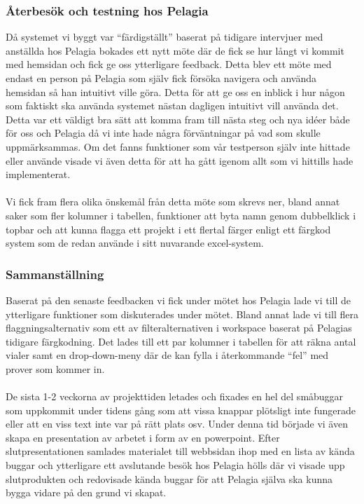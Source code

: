 \subsubsection{Återbesök och testning hos Pelagia}
Då systemet vi byggt var “färdigställt” baserat på tidigare intervjuer med anställda hos Pelagia bokades ett nytt möte där de fick se hur långt vi kommit med hemsidan och fick ge oss ytterligare feedback. Detta blev ett möte med endast en person på Pelagia som själv fick försöka navigera och använda hemsidan så han intuitivt ville göra. Detta för att ge oss en inblick i hur någon som faktiskt ska använda systemet nästan dagligen intuitivt vill använda det. Detta var ett väldigt bra sätt att komma fram till nästa steg och nya idéer både för oss och Pelagia då vi inte hade några förväntningar på vad som skulle uppmärksammas. Om det fanns funktioner som vår testperson själv inte hittade eller använde visade vi även detta för att ha gått igenom allt som vi hittills hade implementerat. 
\\
\\
Vi fick fram flera olika önskemål från detta möte som skrevs ner, bland annat saker som fler kolumner i tabellen, funktioner att byta namn genom dubbelklick i topbar och att kunna flagga ett projekt i ett flertal färger enligt ett färgkod system som de redan använde i sitt nuvarande excel-system.

\subsubsection{Sammanställning}
Baserat på den senaste feedbacken vi fick under mötet hos Pelagia lade vi till de ytterligare funktioner som diskuterades under mötet. Bland annat lade vi till flera flaggningsalternativ som ett av filteralternativen i workspace baserat på Pelagias tidigare färgkodning. Det lades till ett par kolumner i tabellen för att räkna antal vialer samt en drop-down-meny där de kan fylla i återkommande “fel” med prover som kommer in. 
\\
\\
De sista 1-2 veckorna av projekttiden letades och fixades en hel del småbuggar som uppkommit under tidens gång som att vissa knappar plötsligt inte fungerade eller att en viss text inte var på rätt plats osv. Under denna tid började vi även skapa en presentation av arbetet i form av en powerpoint. Efter slutpresentationen samlades materialet till webbsidan ihop med en lista av kända buggar och ytterligare ett avslutande besök hos Pelagia hölls där vi visade upp slutprodukten och redovisade kända buggar för att Pelagia själva ska kunna bygga vidare på den grund vi skapat. 

